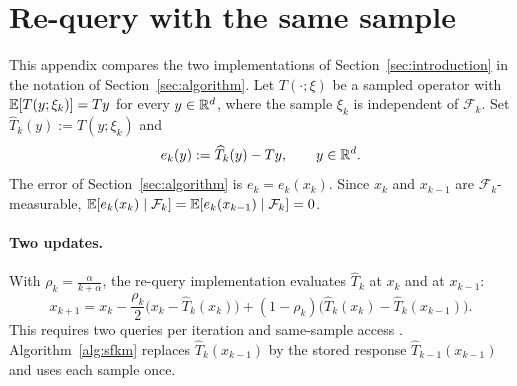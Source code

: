 \documentclass[10pt,draft]{article}
\numberwithin{equation}{section}
\theoremstyle{definition}
\theoremstyle{remark}
\newcommand{\HH}{\RR^d}
\newcommand{\FF}{\mathcal F}
\begin{document}


\appendix
\section{Re-query with the same sample}\label{app:requery}

This appendix compares the two implementations of
Section~\ref{sec:introduction} in the notation of
Section~\ref{sec:algorithm}. Let $T(\cdot;\xi)$ be a sampled operator with
$\mathbb{E}[T(y;\xi_k)]=Ty$ for every $y\in\HH$, where the sample $\xi_k$ is
independent of $\FF_k$. Set $\widehat T_k(y):=T(y;\xi_k)$ and
\[
 e_k(y):=\widehat T_k(y)-Ty,\qquad y\in\HH.
\]
The error of Section~\ref{sec:algorithm} is $e_k=e_k(x_k)$. Since $x_k$ and
$x_{k-1}$ are $\FF_k$-measurable,
$\EE[e_k(x_k)\mid\FF_k]=\EE[e_k(x_{k-1})\mid\FF_k]=0$.

\paragraph{Two updates.} With $\rho_k=\frac{\alpha}{k+\alpha}$, the
re-query implementation evaluates $\widehat T_k$ at $x_k$ and at $x_{k-1}$:
\begin{equation}\label{eq:requery-update}
 x_{k+1}=x_k-\frac{\rho_k}{2}\bigl(x_k-\widehat T_k(x_k)\bigr)
 +(1-\rho_k)\bigl(\widehat T_k(x_k)-\widehat T_k(x_{k-1})\bigr).
\end{equation}
This requires two queries per iteration and same-sample access
\cite[Assumption~2.3]{lee2026fixed}. Algorithm~\ref{alg:sfkm} replaces
$\widehat T_k(x_{k-1})$ by the stored response $\widehat T_{k-1}(x_{k-1})$
and uses each sample once.
\end{document}
